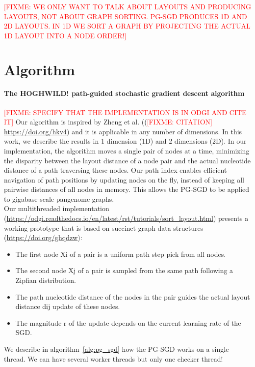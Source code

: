 \documentclass{bioinfo}
\theoremstyle{definition}
\newcommand{\red}[1]{{\textcolor{Red}{#1}}}
\newcommand{\FIXME}[1]{\red{[FIXME: #1]}}
\begin{document}

\FIXME{WE ONLY WANT TO TALK ABOUT LAYOUTS AND PRODUCING LAYOUTS, NOT ABOUT GRAPH SORTING. PG-SGD PRODUCES 1D AND 2D LAYOUTS. IN 1D WE SORT A GRAPH BY PROJECTING THE ACTUAL 1D LAYOUT INTO A NODE ORDER!}

\section{Algorithm}

\paragraph{The HOGHWILD! path-guided stochastic gradient descent algorithm}
\FIXME{SPECIFY THAT THE IMPLEMENTATION IS IN ODGI AND CITE IT}
Our algorithm is inspired by Zheng et al. ((\FIXME{CITATION} \url{https://doi.org/hkv4}) and it is applicable in any number of dimensions.
In this work, we describe the results in 1 dimension (1D) and 2 dimensions (2D).
In our implementation, the algorithm moves a single pair of nodes at a time, minimizing the disparity between the layout distance of a node pair and the actual nucleotide distance of a path traversing these nodes.
Our path index enables efficient navigation of path positions by updating nodes on the fly, instead of keeping all pairwise distances of all nodes in memory.
This allows the PG-SGD to be applied to gigabase-scale pangenome graphs. \\
Our multithreaded implementation (\url{https://odgi.readthedocs.io/en/latest/rst/tutorials/sort_layout.html}) presents a working prototype that is based on succinct graph data structures (\url{https://doi.org/ghqdzw}):
\begin{itemize}
    \item The first node Xi of a pair is a uniform path step pick from all nodes.
    \item The second node Xj of a pair is sampled from the same path following a Zipfian distribution.
    \item The path nucleotide distance of the nodes in the pair guides the actual layout distance dij update of these nodes.
    \item The magnitude r of the update depends on the current learning rate of the SGD.
\end{itemize}
We describe in algorithm~\ref{alg:pg_sgd} how the PG-SGD works on a single thread.
We can have several worker threads but only one checker thread!
\end{document}
